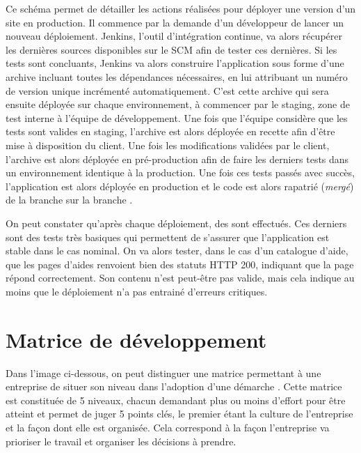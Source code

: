 Ce schéma permet de détailler les actions réalisées pour déployer une version d'un site \naq{} en production. Il commence par la demande d'un développeur de lancer un nouveau déploiement. Jenkins, l'outil d'intégration continue, va alors récupérer les dernières sources disponibles sur le \gls{SCM} afin de tester ces dernières. Si les tests sont concluants, Jenkins va alors construire l'application sous forme d'une archive incluant toutes les dépendances nécessaires, en lui attribuant un numéro de version unique incrémenté automatiquement. C'est cette archive qui sera ensuite déployée sur chaque environnement, à commencer par le staging, zone de test interne à l'équipe de développement. Une fois que l'équipe considère que les tests sont valides en staging, l'archive est alors déployée en recette afin d'être mise à disposition du client. Une fois les modifications validées par le client, l'archive est alors déployée en pré-production afin de faire les derniers tests dans un environnement identique à la production. Une fois ces tests passés avec succès, l'application est alors déployée en production et le code est alors rapatrié (\emph{mergé}) de la branche  sur la branche . 

On peut constater qu'après chaque déploiement, des  sont effectués. Ces derniers sont des tests très basiques qui permettent de s'assurer que l'application est stable dans le cas nominal. On va alors tester, dans le cas d'un catalogue d'aide, que les pages d'aides renvoient bien des statuts \gls{HTTP} 200, indiquant que la page répond correctement. Son contenu n'est peut-être pas valide, mais cela indique au moins que le déploiement n'a pas entrainé d'erreurs critiques. 


\clearpage
\section{Matrice de développement \devops}

Dans l'image ci-dessous, on peut distinguer une matrice permettant à une entreprise de situer son niveau dans l'adoption d'une démarche \devops. Cette matrice est constituée de 5 niveaux, chacun demandant plus ou moins d'effort pour être atteint et permet de juger 5 points clés, le premier étant la culture de l'entreprise et la façon dont elle est organisée. Cela correspond à la façon l'entreprise va prioriser le travail et organiser les décisions à prendre.

